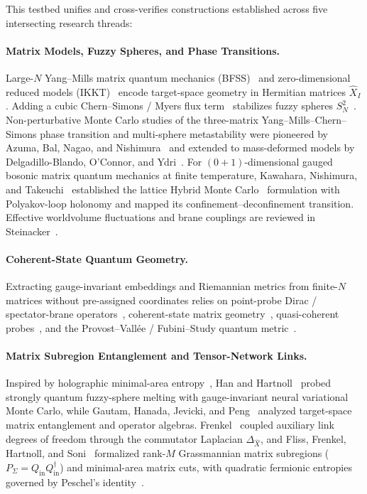 \documentclass[11pt,a4paper]{article}
\begin{document}
This testbed unifies and cross-verifies constructions established across five intersecting research threads:

\paragraph{Matrix Models, Fuzzy Spheres, and Phase Transitions.}
Large-$N$ Yang--Mills matrix quantum mechanics (BFSS)~\cite{Banks1997} and zero-dimensional reduced models (IKKT)~\cite{Ishibashi1997} encode target-space geometry in Hermitian matrices $\hat{X}_I$. Adding a cubic Chern--Simons / Myers flux term~\cite{Myers1999} stabilizes fuzzy spheres $S^2_N$~\cite{Madore1992}. Non-perturbative Monte Carlo studies of the three-matrix Yang--Mills--Chern--Simons phase transition and multi-sphere metastability were pioneered by Azuma, Bal, Nagao, and Nishimura~\cite{Azuma2004} and extended to mass-deformed models by Delgadillo-Blando, O'Connor, and Ydri~\cite{DelgadilloBlando2008}. For $(0+1)$-dimensional gauged bosonic matrix quantum mechanics at finite temperature, Kawahara, Nishimura, and Takeuchi~\cite{Kawahara2007} established the lattice Hybrid Monte Carlo~\cite{Duane1987} formulation with Polyakov-loop holonomy and mapped its confinement--deconfinement transition. Effective worldvolume fluctuations and brane couplings are reviewed in Steinacker~\cite{Steinacker2024}.

\paragraph{Coherent-State Quantum Geometry.}
Extracting gauge-invariant embeddings and Riemannian metrics from finite-$N$ matrices without pre-assigned coordinates relies on point-probe Dirac / spectator-brane operators~\cite{Berenstein2012}, coherent-state matrix geometry~\cite{Ishiki2015}, quasi-coherent probes~\cite{Schneiderbauer2016}, and the Provost--Vall\'ee / Fubini--Study quantum metric~\cite{Provost1980}.

\paragraph{Matrix Subregion Entanglement and Tensor-Network Links.}
Inspired by holographic minimal-area entropy~\cite{Ryu2006}, Han and Hartnoll~\cite{Han2020} probed strongly quantum fuzzy-sphere melting with gauge-invariant neural variational Monte Carlo, while Gautam, Hanada, Jevicki, and Peng~\cite{Gautam2022,Gautam2025} analyzed target-space matrix entanglement and operator algebras. Frenkel~\cite{Frenkel2024} coupled auxiliary link degrees of freedom through the commutator Laplacian $\Delta_{\hat{X}}$, and Fliss, Frenkel, Hartnoll, and Soni~\cite{Fliss2025} formalized rank-$M$ Grassmannian matrix subregions ($P_\Sigma = Q_{\mathrm{in}}Q_{\mathrm{in}}^\dagger$) and minimal-area matrix cuts, with quadratic fermionic entropies governed by Peschel's identity~\cite{Peschel2003}.
\end{document}
